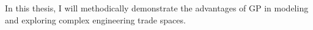 

In this thesis, I will methodically demonstrate the advantages of \gls{GP} in modeling
and exploring complex engineering trade spaces.



